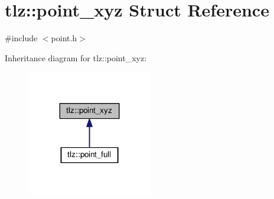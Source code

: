 \hypertarget{structtlz_1_1point__xyz}{}\section{tlz\+:\+:point\+\_\+xyz Struct Reference}
\label{structtlz_1_1point__xyz}


{\ttfamily \#include $<$point.\+h$>$}



Inheritance diagram for tlz\+:\+:point\+\_\+xyz\+:
\nopagebreak
\begin{figure}[H]
\begin{center}
\leavevmode
\includegraphics[width=155pt]{structtlz_1_1point__xyz__inherit__graph}
\end{center}
\end{figure}
